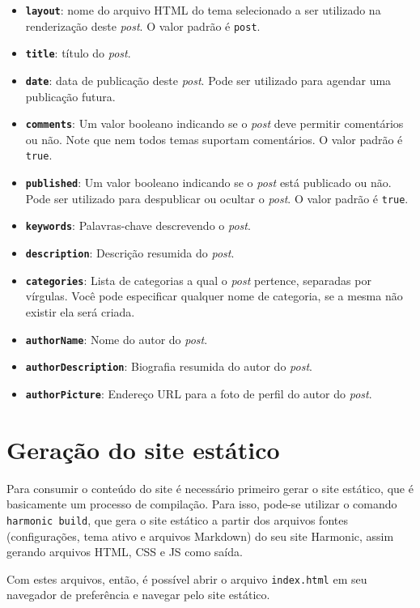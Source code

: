 \documentclass[ppginf, pep]{esinucpel}
\newcommand{\code}[1]{\texttt{#1}}
\begin{document}
\begin{itemize}
	\item \textbf{\code{layout}}: nome do arquivo HTML do tema selecionado a ser utilizado na renderização deste \textit{post}. O valor padrão é \code{post}.
	\item \textbf{\code{title}}: título do \textit{post}.
	\item \textbf{\code{date}}: data de publicação deste \textit{post}. Pode ser utilizado para agendar uma publicação futura.
	\item \textbf{\code{comments}}: Um valor booleano indicando se o \textit{post} deve permitir comentários ou não. Note que nem todos temas suportam comentários. O valor padrão é \code{true}.
	\item \textbf{\code{published}}: Um valor booleano indicando se o \textit{post} está publicado ou não. Pode ser utilizado para despublicar ou ocultar o \textit{post}. O valor padrão é \code{true}.
	\item \textbf{\code{keywords}}: Palavras-chave descrevendo o \textit{post}.
	\item \textbf{\code{description}}: Descrição resumida do \textit{post}.
	\item \textbf{\code{categories}}: Lista de categorias a qual o \textit{post} pertence, separadas por vírgulas. Você pode especificar qualquer nome de categoria, se a mesma não existir ela será criada.
	\item \textbf{\code{authorName}}: Nome do autor do \textit{post}.
	\item \textbf{\code{authorDescription}}: Biografia resumida do autor do \textit{post}.
	\item \textbf{\code{authorPicture}}: Endereço URL para a foto de perfil do autor do \textit{post}.
\end{itemize}

\section{Geração do site estático}

Para consumir o conteúdo do site é necessário primeiro gerar o site estático, que é basicamente um processo de compilação. Para isso, pode-se utilizar o comando \code{harmonic build}, que gera o site estático a partir dos arquivos fontes (configurações, tema ativo e arquivos Markdown) do seu site Harmonic, assim gerando arquivos HTML, CSS e JS como saída.

Com estes arquivos, então, é possível abrir o arquivo \code{index.html} em seu navegador de preferência e navegar pelo site estático.
\end{document}
